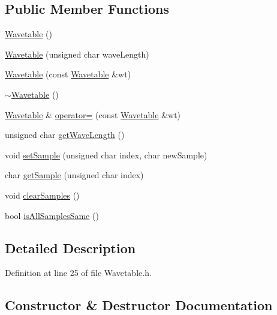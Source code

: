 \subsection*{Public Member Functions}
\begin{DoxyCompactItemize}
\item 
\hyperlink{class_wavetable_a8dd3b6ebfc62270237f53cab076ded22}{Wavetable} ()
\item 
\hyperlink{class_wavetable_a4b95309638a0ba90cf170e8e0b8fa453}{Wavetable} (unsigned char wave\+Length)
\item 
\hyperlink{class_wavetable_ad0d61af03ebf9df4989971ed42245d8f}{Wavetable} (const \hyperlink{class_wavetable}{Wavetable} \&wt)
\item 
\hyperlink{class_wavetable_abcb5f277ac5644c679f9b77b0786d813}{$\sim$\+Wavetable} ()
\item 
\hyperlink{class_wavetable}{Wavetable} \& \hyperlink{class_wavetable_ad54063d548eeb7b1fad18543d4ff15c1}{operator=} (const \hyperlink{class_wavetable}{Wavetable} \&wt)
\item 
unsigned char \hyperlink{class_wavetable_ac7f597021cdace95c4e1e4c88fc36d2a}{get\+Wave\+Length} ()
\item 
void \hyperlink{class_wavetable_a01485340698b4bf92f3065f31feaf4c4}{set\+Sample} (unsigned char index, char new\+Sample)
\item 
char \hyperlink{class_wavetable_a2ed27fd46eac11bd828c7111fca7bc0b}{get\+Sample} (unsigned char index)
\item 
void \hyperlink{class_wavetable_ae4815729b57d8625a17ae0421b394217}{clear\+Samples} ()
\item 
bool \hyperlink{class_wavetable_aeb61e3ae23fc19d5578c5893323b0490}{is\+All\+Samples\+Same} ()
\end{DoxyCompactItemize}


\subsection{Detailed Description}


Definition at line 25 of file Wavetable.\+h.



\subsection{Constructor \& Destructor Documentation}
\mbox{\label{class_wavetable_a8dd3b6ebfc62270237f53cab076ded22}} 
